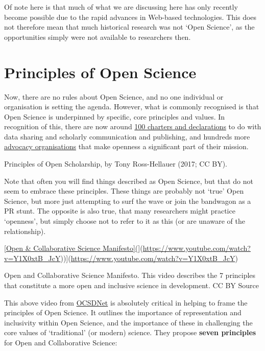 \documentclass[]{book}
\begin{document}
Of note here is that much of what we are discussing here has only recently become possible due to the rapid advances in Web-based technologies. This does not therefore mean that much historical research was not `Open Science', as the opportunities simply were not available to researchers then.

\hypertarget{principles-of-open-science}{%
\section{Principles of Open Science }\label{principles-of-open-science}}

Now, there are no rules about Open Science, and no one individual or organisation is setting the agenda. However, what is commonly recognised is that Open Science is underpinned by specific, core principles and values. In recognition of this, there are now around \href{https://docs.google.com/spreadsheets/d/1-aRXFiRg-VL9hpLpxoJqX6-OC-A0R2oCogHfIx52Nug/edit\#gid=956616118}{100 charters and declarations} to do with data sharing and scholarly communication and publishing, and hundreds more \href{http://oad.simmons.edu/oadwiki/Advocacy_organizations_for_OA}{advocacy organisations} that make openness a significant part of their mission.

Principles of Open Scholarship, by Tony Ross-Hellauer (2017; CC BY).

Note that often you will find things described as Open Science, but that do not seem to embrace these principles. These things are probably not `true' Open Science, but more just attempting to surf the wave or join the bandwagon as a PR stunt. The opposite is also true, that many researchers might practice `openness', but simply choose not to refer to it as this (or are unaware of the relationship).

\href{images/0.jpg}{{[}Open \& Collaborative Science Manifesto{]}(}{]}(\url{https://www.youtube.com/watch?v=Y1X0xtB_JcY})){]}(\url{https://www.youtube.com/watch?v=Y1X0xtB_JcY})

Open and Collaborative Science Manifesto. This video describes the 7 principles that constitute a more open and inclusive science in development. CC BY Source

This above video from \href{https://ocsdnet.org/manifesto/open-science-manifesto/}{OCSDNet} is absolutely critical in helping to frame the principles of Open Science. It outlines the importance of representation and inclusivity within Open Science, and the importance of these in challenging the core values of `traditional' (or modern) science. They propose \textbf{seven principles} for Open and Collaborative Science:
\end{document}
